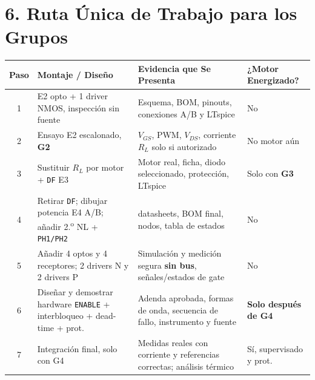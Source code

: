\documentclass[10pt, a4paper, landscape]{article}
\begin{document}
\newpage
\section*{6. Ruta Única de Trabajo para los Grupos}

\par\vspace{0.05cm}
{\footnotesize
\renewcommand{\arraystretch}{1.16}%
\noindent\begin{tabularx}{\linewidth}{|c|>{\raggedright\arraybackslash}p{6.6cm}|>{\raggedright\arraybackslash}X|>{\raggedright\arraybackslash}p{3.4cm}|}
\hline
\rowcolor{ucbgray}
\textbf{Paso} & \textbf{Montaje / Diseño} & \textbf{Evidencia que Se Presenta} & \textbf{¿Motor Energizado?} \\ \hline
1 & E2 opto + 1 driver NMOS, inspección sin fuente & Esquema, BOM, pinouts, conexiones A/B y LTspice & No \\ \hline
2 & Ensayo E2 escalonado, \textbf{G2} & $V_{GS}$, PWM, $V_{DS}$, corriente $R_L$ solo si autorizado & No motor aún \\ \hline
3 & Sustituir $R_L$ por motor + \texttt{DF} E3 & Motor real, ficha, diodo seleccionado, protección, LTspice & Solo con \textbf{G3} \\ \hline
4 & Retirar \texttt{DF}; dibujar potencia E4 A/B; añadir 2.\textsuperscript{o} NL + \texttt{PH1/PH2} & 4 datasheets, BOM final, nodos, tabla de estados & No \\ \hline
5 & Añadir 4 optos y 4 receptores; 2 drivers N y 2 drivers P & Simulación y medición segura \textbf{sin bus}, señales/estados de gate & No \\ \hline
6 & Diseñar y demostrar hardware \texttt{ENABLE} + interbloqueo + dead-time + prot. & Adenda aprobada, formas de onda, secuencia de fallo, instrumento y fuente & \textbf{Solo después de G4} \\ \hline
7 & Integración final, solo con G4 & Medidas reales con corriente y referencias correctas; análisis térmico & Sí, supervisado y prot. \\ \hline
\end{tabularx}\par}

\end{document}
